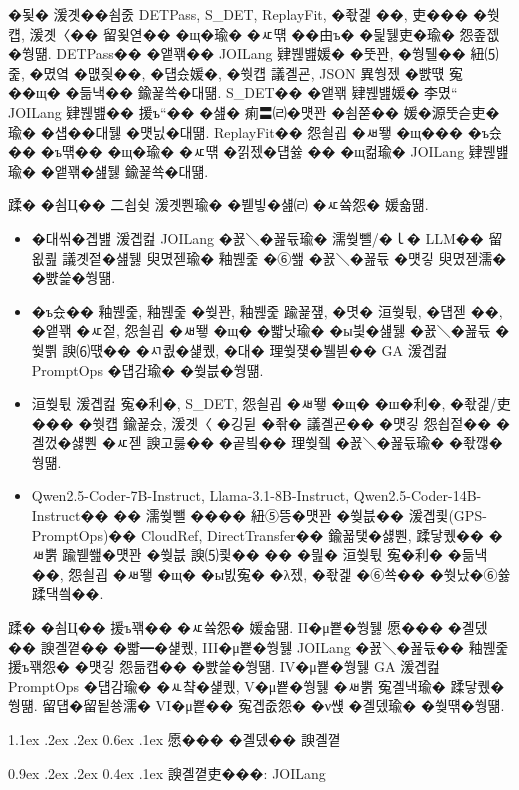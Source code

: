 \documentclass[10pt,twocolumn]{article}
\makeatletter
\renewcommand{\section}{\@startsection{section}{1}{\z@}%
{1.1ex \@plus .2ex \@minus .2ex}%
{0.6ex \@plus .1ex}%
{\normalfont\normalsize\bfseries}}
\renewcommand{\subsection}{\@startsection{subsection}{2}{\z@}%
{0.9ex \@plus .2ex \@minus .2ex}%
{0.4ex \@plus .1ex}%
{\normalfont\normalsize\bfseries}}
\makeatother
\begin{document}
�됯� 湲곗��쇰줈 DETPass, S\_DET, ReplayFit, �좏겙 ��, 吏��� �쒓컙, 湲곗〈�� 留욏엳�� �щ�瑜� �ㅼ떆 ��由ъ� �딅뒗吏�瑜� 怨좊젮�쒕떎. DETPass�� �앹꽦�� JOILang 肄붾뱶媛� �뚯꽌, �쒕퉬�� 紐⑸줉, �몄옄 �먮즺��, �덉슜媛�, �쒓컙 議곌굔, JSON 異쒕젰 �뺤떇 寃��щ� �듦낵�� 鍮꾩쑉�대떎. S\_DET�� �앹꽦 肄붾뱶媛� 李몄“ JOILang 肄붾뱶�� 援ъ“�� �섎� 痢〓㈃�먯꽌 �쇰쭏�� 媛�源뚯슫吏�瑜� �섑��대뒗 �먯닔�대떎. ReplayFit�� 怨쇨굅 �ㅽ뙣 �щ��� �ъ슜�� �ъ떆�� �щ�瑜� �ㅼ떆 �낅젰�덉쓣 �� �щ컮瑜� JOILang 肄붾뱶瑜� �앹꽦�섎뒗 鍮꾩쑉�대떎.

蹂� �쇰Ц�� 二쇱슂 湲곗뿬瑜� �붿빟�섎㈃ �ㅼ쓬怨� 媛숇떎.
\begin{itemize}[leftmargin=1.4em, itemsep=0.2em, parsep=0pt, topsep=0.3em]
\item �대씪�곕뱶 湲곕컲 JOILang �꾨＼�꾪듃瑜� 濡쒖뺄/�ｌ� LLM�� 留욊쾶 議곗젙�섎뒗 臾몄젣瑜� 釉붾줉 �⑥쐞 �꾨＼�꾪듃 �먯깋 臾몄젣濡� �뺤쓽�쒕떎.
\item �ъ슜�� 釉붾줉, 釉붾줉 �쒖꽌, 釉붾줉 踰꾩쟾, �몃� 洹쒖튃, �덉젣 ��, �앹꽦 �ㅼ젙, 怨쇨굅 �ㅽ뙣 �щ� �뺣낫瑜� �ы븿�섎뒗 �꾨＼�꾪듃 �쒗쁽 諛⑹떇�� �ㅺ퀎�섍퀬, �대� 理쒖쟻�뷀븯�� GA 湲곕컲 PromptOps �덉감瑜� �쒖븞�쒕떎.
\item 洹쒖튃 湲곕컲 寃�利�, S\_DET, 怨쇨굅 �ㅽ뙣 �щ� �ш�利�, �좏겙/吏��� �쒓컙 鍮꾩슜, 湲곗〈 �깅뒫 �좎� 議곌굔�� �먯깋 怨쇱젙�� �곌껐�섏뿬 �ㅼ젣 諛고룷�� �곹빀�� 理쒖쥌 �꾨＼�꾪듃瑜� �좏깮�쒕떎.
\item Qwen2.5-Coder-7B-Instruct, Llama-3.1-8B-Instruct, Qwen2.5-Coder-14B-Instruct�� �� 濡쒖뺄 ���� 紐⑤뜽�먯꽌 �쒖븞�� 湲곕쾿(GPS-PromptOps)�� CloudRef, DirectTransfer�� 鍮꾧탳�섏뿬, 蹂닿퀬�� �ㅽ뿕 踰붿쐞�먯꽌 �쒖븞 諛⑸쾿�� �� �믪� 洹쒖튃 寃�利� �듦낵��, 怨쇨굅 �ㅽ뙣 �щ� �ы빐寃� �λ젰, �좏겙 �⑥쑉�� �쒓났�⑥쓣 蹂댁씤��.
\end{itemize}

蹂� �쇰Ц�� 援ъ꽦�� �ㅼ쓬怨� 媛숇떎. II�μ뿉�쒕뒗 愿��� �곌뎄�� 諛곌꼍�� �뺣━�섍퀬, III�μ뿉�쒕뒗 JOILang �꾨＼�꾪듃�� 釉붾줉 援ъ꽦怨� �먯깋 怨듦컙�� �뺤쓽�쒕떎. IV�μ뿉�쒕뒗 GA 湲곕컲 PromptOps �덉감瑜� �ㅻ챸�섍퀬, V�μ뿉�쒕뒗 �ㅽ뿕 寃곌낵瑜� 蹂닿퀬�쒕떎. 留덉�留됱쑝濡� VI�μ뿉�� 寃곕줎怨� �ν썑 �곌뎄瑜� �쒖떆�쒕떎.

\section{愿��� �곌뎄�� 諛곌꼍}

\subsection{諛곌꼍吏���: JOILang}
\end{document}
